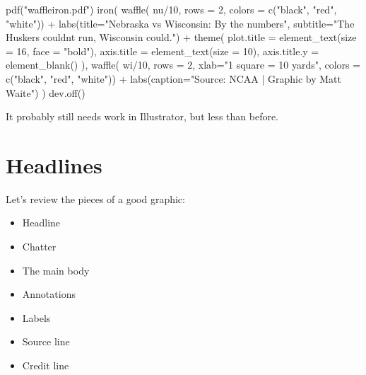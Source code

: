 \documentclass[
]{book}
\newenvironment{Shaded}{\begin{snugshade}}{\end{snugshade}}
\newcommand{\AttributeTok}[1]{\textcolor[rgb]{0.77,0.63,0.00}{#1}}
\newcommand{\DecValTok}[1]{\textcolor[rgb]{0.00,0.00,0.81}{#1}}
\newcommand{\FunctionTok}[1]{\textcolor[rgb]{0.00,0.00,0.00}{#1}}
\newcommand{\NormalTok}[1]{#1}
\newcommand{\SpecialCharTok}[1]{\textcolor[rgb]{0.00,0.00,0.00}{#1}}
\newcommand{\StringTok}[1]{\textcolor[rgb]{0.31,0.60,0.02}{#1}}
\providecommand{\tightlist}{%
  \setlength{\itemsep}{0pt}\setlength{\parskip}{0pt}}
\begin{document}
\begin{Shaded}
\begin{Highlighting}[]
\FunctionTok{pdf}\NormalTok{(}\StringTok{"waffleiron.pdf"}\NormalTok{)}
\FunctionTok{iron}\NormalTok{(}
 \FunctionTok{waffle}\NormalTok{(}
\NormalTok{   nu}\SpecialCharTok{/}\DecValTok{10}\NormalTok{, }
   \AttributeTok{rows =} \DecValTok{2}\NormalTok{, }
   \AttributeTok{colors =} \FunctionTok{c}\NormalTok{(}\StringTok{"black"}\NormalTok{, }\StringTok{"red"}\NormalTok{, }\StringTok{"white"}\NormalTok{)) }\SpecialCharTok{+} 
   \FunctionTok{labs}\NormalTok{(}\AttributeTok{title=}\StringTok{"Nebraska vs Wisconsin: By the numbers"}\NormalTok{, }\AttributeTok{subtitle=}\StringTok{"The Huskers couldn\textquotesingle{}t run, Wisconsin could."}\NormalTok{) }\SpecialCharTok{+} 
   \FunctionTok{theme}\NormalTok{(}
    \AttributeTok{plot.title =} \FunctionTok{element\_text}\NormalTok{(}\AttributeTok{size =} \DecValTok{16}\NormalTok{, }\AttributeTok{face =} \StringTok{"bold"}\NormalTok{),}
    \AttributeTok{axis.title =} \FunctionTok{element\_text}\NormalTok{(}\AttributeTok{size =} \DecValTok{10}\NormalTok{),}
    \AttributeTok{axis.title.y =} \FunctionTok{element\_blank}\NormalTok{()}
\NormalTok{  ),}
 \FunctionTok{waffle}\NormalTok{(}
\NormalTok{   wi}\SpecialCharTok{/}\DecValTok{10}\NormalTok{, }
   \AttributeTok{rows =} \DecValTok{2}\NormalTok{, }
   \AttributeTok{xlab=}\StringTok{"1 square = 10 yards"}\NormalTok{, }
   \AttributeTok{colors =} \FunctionTok{c}\NormalTok{(}\StringTok{"black"}\NormalTok{, }\StringTok{"red"}\NormalTok{, }\StringTok{"white"}\NormalTok{)) }\SpecialCharTok{+} \FunctionTok{labs}\NormalTok{(}\AttributeTok{caption=}\StringTok{"Source: NCAA | Graphic by Matt Waite"}\NormalTok{)}
\NormalTok{) }
\FunctionTok{dev.off}\NormalTok{()}
\end{Highlighting}
\end{Shaded}

It probably still needs work in Illustrator, but less than before.

\hypertarget{headlines}{%
\chapter{Headlines}\label{headlines}}

Let's review the pieces of a good graphic:

\begin{itemize}
\tightlist
\item
  Headline
\item
  Chatter
\item
  The main body
\item
  Annotations
\item
  Labels
\item
  Source line
\item
  Credit line
\end{itemize}
\end{document}
